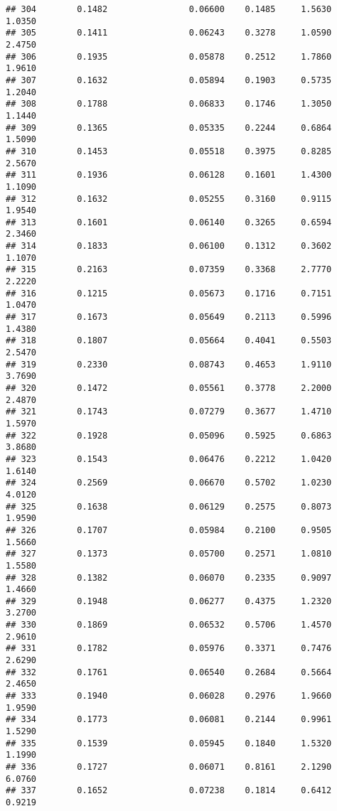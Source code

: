 \documentclass[
]{article}
\begin{document}
\begin{verbatim}
## 304        0.1482                0.06600    0.1485     1.5630       1.0350
## 305        0.1411                0.06243    0.3278     1.0590       2.4750
## 306        0.1935                0.05878    0.2512     1.7860       1.9610
## 307        0.1632                0.05894    0.1903     0.5735       1.2040
## 308        0.1788                0.06833    0.1746     1.3050       1.1440
## 309        0.1365                0.05335    0.2244     0.6864       1.5090
## 310        0.1453                0.05518    0.3975     0.8285       2.5670
## 311        0.1936                0.06128    0.1601     1.4300       1.1090
## 312        0.1632                0.05255    0.3160     0.9115       1.9540
## 313        0.1601                0.06140    0.3265     0.6594       2.3460
## 314        0.1833                0.06100    0.1312     0.3602       1.1070
## 315        0.2163                0.07359    0.3368     2.7770       2.2220
## 316        0.1215                0.05673    0.1716     0.7151       1.0470
## 317        0.1673                0.05649    0.2113     0.5996       1.4380
## 318        0.1807                0.05664    0.4041     0.5503       2.5470
## 319        0.2330                0.08743    0.4653     1.9110       3.7690
## 320        0.1472                0.05561    0.3778     2.2000       2.4870
## 321        0.1743                0.07279    0.3677     1.4710       1.5970
## 322        0.1928                0.05096    0.5925     0.6863       3.8680
## 323        0.1543                0.06476    0.2212     1.0420       1.6140
## 324        0.2569                0.06670    0.5702     1.0230       4.0120
## 325        0.1638                0.06129    0.2575     0.8073       1.9590
## 326        0.1707                0.05984    0.2100     0.9505       1.5660
## 327        0.1373                0.05700    0.2571     1.0810       1.5580
## 328        0.1382                0.06070    0.2335     0.9097       1.4660
## 329        0.1948                0.06277    0.4375     1.2320       3.2700
## 330        0.1869                0.06532    0.5706     1.4570       2.9610
## 331        0.1782                0.05976    0.3371     0.7476       2.6290
## 332        0.1761                0.06540    0.2684     0.5664       2.4650
## 333        0.1940                0.06028    0.2976     1.9660       1.9590
## 334        0.1773                0.06081    0.2144     0.9961       1.5290
## 335        0.1539                0.05945    0.1840     1.5320       1.1990
## 336        0.1727                0.06071    0.8161     2.1290       6.0760
## 337        0.1652                0.07238    0.1814     0.6412       0.9219

\end{verbatim}
\end{document}
